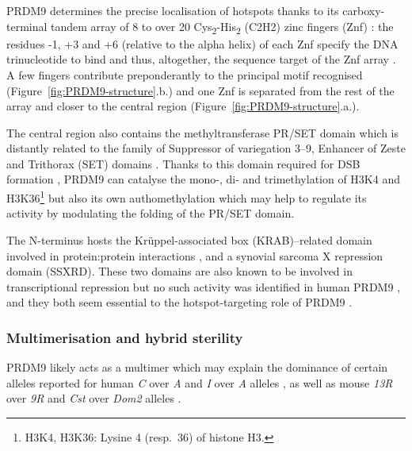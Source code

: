 PRDM9 determines the precise localisation of hotspots thanks to its carboxy-terminal tandem array of 8 to over 20 Cys\textsubscript{2}-His\textsubscript{2} (C2H2) zinc fingers (Znf) \citep[reviewed in][]{paigen2018prdm9}: the residues -1, +3 and +6 (relative to the alpha helix) of each Znf specify the DNA trinucleotide to bind and thus, altogether, the sequence target of the Znf array \citep{neale2010prdm9}.
A few fingers contribute preponderantly to the principal motif recognised (Figure~\ref{fig:PRDM9-structure}.b.) and one Znf is separated from the rest of the array and closer to the central region (Figure~\ref{fig:PRDM9-structure}.a.).

The central region also contains the methyltransferase PR/SET domain which is distantly related to the family of Suppressor of variegation 3–9, Enhancer of Zeste and Trithorax (SET) domains \citep[reviewed in][]{grey2018prdm9}.
Thanks to this domain required for DSB formation \citep{diagouraga2018prdm9}, PRDM9 can catalyse the mono-, di- and trimethylation of H3K4 and H3K36\footnote{H3K4, H3K36: Lysine 4 (resp.\ 36) of histone H3.} \citep{wu2013molecular,powers2016meiotic} but also its own authomethylation \citep{koh-stenta2017discovery} which may help to regulate its activity by modulating the folding of the PR/SET domain.

The N-terminus hosts the Kr\"uppel-associated box (KRAB)–related domain involved in protein:protein interactions \citep{parvanov2016prdm9,parvanov2017prdm9,imai2017prdm9}, and a synovial sarcoma X repression domain (SSXRD).
These two domains are also known to be involved in transcriptional repression \citep{margolin1994kruppelassociated,lim1998krabrelated} but no such activity was identified in human PRDM9 \citep{born2014bsubdomain}, and they both seem essential to the hotspot-targeting role of PRDM9 \citep{baker2017repeated,thibault-sennett2018interrogating}.


\subsubsection{Multimerisation and hybrid sterility}

PRDM9 likely acts as a multimer \citep{baker2015multimer,altemose2017map,schwarz2018prdm9} which may explain the dominance of certain alleles reported for human \textit{C} over \textit{A} \citep{pratto2014recombination} and \textit{I} over \textit{A} alleles \citep{baudat2010prdm9}, as well as mouse \textit{13R} over \textit{9R} \citep{brick2012genetic} and \textit{Cst} over \textit{Dom2} alleles \citep{smagulova2011genomewide, baker2015prdm9, baker2015multimer}.


